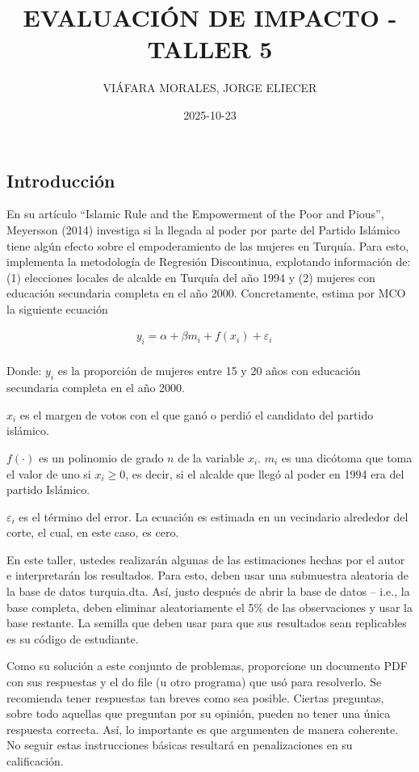 \documentclass[
]{article}
\title{EVALUACIÓN DE IMPACTO - TALLER 5}
\author{VIÁFARA MORALES, JORGE ELIECER}
\date{2025-10-23}
\begin{document}
\maketitle

\subsection{Introducción}\label{introducciuxf3n}

En su artículo ``Islamic Rule and the Empowerment of the Poor and
Pious'', Meyersson (2014) investiga si la llegada al poder por parte del
Partido Islámico tiene algún efecto sobre el empoderamiento de las
mujeres en Turquía. Para esto, implementa la metodología de Regresión
Discontinua, explotando información de: (1) elecciones locales de
alcalde en Turquía del año 1994 y (2) mujeres con educación secundaria
completa en el año 2000. Concretamente, estima por MCO la siguiente
ecuación

\begin{align}
y_{i}=α+\beta m_i+f(x_i)+ε_i\quad \nonumber \\
\end{align}

Donde: \(y_i\) es la proporción de mujeres entre 15 y 20 años con
educación secundaria completa en el año 2000.

\(x_i\) es el margen de votos con el que ganó o perdió el candidato del
partido islámico.

\(f(⋅)\) es un polinomio de grado \(n\) de la variable \(x_i\). \(m_i\)
es una dicótoma que toma el valor de uno si \(x_i≥0\), es decir, si el
alcalde que llegó al poder en 1994 era del partido Islámico.

\(ε_i\) es el término del error. La ecuación es estimada en un
vecindario alrededor del corte, el cual, en este caso, es cero.

En este taller, ustedes realizarán algunas de las estimaciones hechas
por el autor e interpretarán los resultados. Para esto, deben usar una
submuestra aleatoria de la base de datos turquia.dta. Así, justo después
de abrir la base de datos -- i.e., la base completa, deben eliminar
aleatoriamente el 5\% de las observaciones y usar la base restante. La
semilla que deben usar para que sus resultados sean replicables es su
código de estudiante.

Como su solución a este conjunto de problemas, proporcione un documento
PDF con sus respuestas y el do file (u otro programa) que usó para
resolverlo. Se recomienda tener respuestas tan breves como sea posible.
Ciertas preguntas, sobre todo aquellas que preguntan por su opinión,
pueden no tener una única respuesta correcta. Así, lo importante es que
argumenten de manera coherente. No seguir estas instrucciones básicas
resultará en penalizaciones en su calificación.
\end{document}
